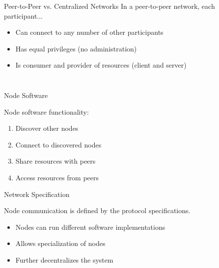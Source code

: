 \documentclass[handout]{beamer}
\begin{document}
\begin{frame}{Peer-to-Peer vs. Centralized Networks}
	\vspace{1em}
	In a peer-to-peer network, each participant...
	\vspace{0.5em}
		\begin{itemize}
			\item<2-> Can connect to any number of other participants
			\item<3-> Has equal privileges (no administration)
			\item<4-> Is consumer and provider of resources (client and server)
		\end{itemize}
	\begin{columns}[T]
		\begin{column}{0.5\textwidth}
			\vspace{2.5em}
			\begin{figure}
				
			\end{figure}
		\end{column}
		\begin{column}{0.5\textwidth}
			\begin{figure}
				
			\end{figure}
		\end{column}
	\end{columns}
\end{frame}


\begin{frame}{Node Software}
	\begin{figure}
		
	\end{figure}
	\vspace{.5 cm}
	Node software functionality:
	\begin{enumerate}
		\item Discover other nodes
		\item<2-> Connect to discovered nodes
		\item<3-> Share resources with peers
		\item<4-> Access resources from peers
	\end{enumerate}
\end{frame}

\begin{frame}{Network Specification}
	\begin{figure}
		
	\end{figure}
	\vspace{.5 cm}
	Node communication is defined by the \color{focus}protocol specifications\color{black}.
	\begin{itemize}
		\item<2-> Nodes can run different software implementations
		\item<3-> Allows specialization of nodes
		\item<3-> \color{focus}Further decentralizes \color{black}the system
	\end{itemize}
\end{frame}
\end{document}
